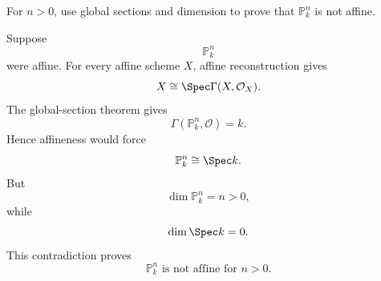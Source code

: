 \begin{problem}\label{prob:vi36-12}
For \(n>0\), use global sections and dimension to prove that \(\mathbb P^n_k\) is not affine.
\end{problem}

\ifdefined\FullProblemDossiers
\begin{solution}
Suppose
\[
\mathbb P^n_k
\]
were affine. For every affine scheme \(X\), affine reconstruction gives
\[
X\cong\Spec\Gamma(X,\mathcal O_X).
\]
The global-section theorem gives
\[
\Gamma(\mathbb P^n_k,\mathcal O)=k.
\]
Hence affineness would force
\[
\mathbb P^n_k\cong\Spec k.
\]
But
\[
\dim\mathbb P^n_k=n>0,
\]
while
\[
\dim\Spec k=0.
\]
This contradiction proves
\[
\boxed{\mathbb P^n_k\text{ is not affine for }n>0}.
\]
\end{solution}
\fi
